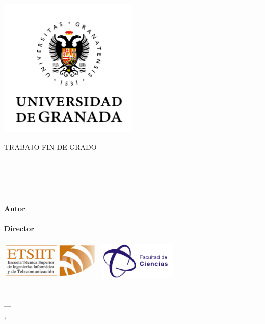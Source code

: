 \documentclass[../main.tex]{memoir}
\begin{document}
\begin{titlingpage}

  \newlength{\centeroffset}
  \setlength{\centeroffset}{-0.5\oddsidemargin}
  \addtolength{\centeroffset}{0.5\evensidemargin}
  \thispagestyle{empty}

  \noindent\hspace*{\centeroffset}
  \begin{minipage}{\textwidth}
    \vspace{-2cm}
    \centering
    \includegraphics[width=0.5\textwidth]{images/logo_ugr.jpg}

    \textsc{ \Large TRABAJO FIN DE GRADO\\[0.2cm]}
    \textsc{ \Degree }\\[1cm]

    {\Large\bfseries \ProjectTitle\\
    }
    \noindent\rule[-1ex]{\textwidth}{3pt}\\[3.5ex]
  \end{minipage}

  \vspace{2cm}
  \noindent\hspace*{\centeroffset}\begin{minipage}{\textwidth}
    \centering

    \textbf{Autor}\\ {\AuthorName}\\[2.5ex]
    \textbf{Director}\\
    {\MainProf}\\[1.5cm]
   \includegraphics[height=1.8cm]{images/etsiit_logo.png}
   \includegraphics[height=1.8cm]{images/logo_ciencias.jpeg}\\[0.1cm]
   \textsc{\FacultyOne}\\
   \textsc{\FacultyTwo}\\
    \textsc{---}\\
    \Location, \Time
  \end{minipage}

\end{titlingpage}
\end{document}
